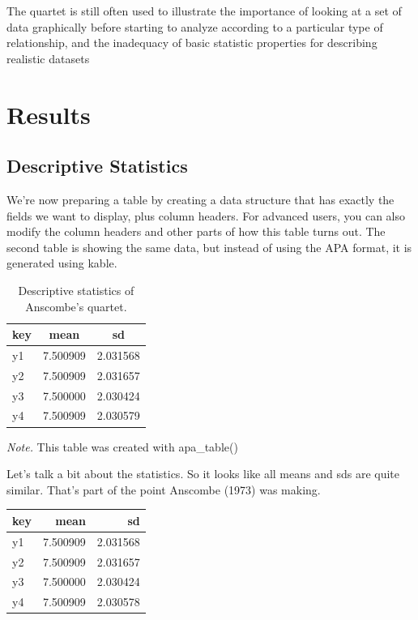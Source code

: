 \documentclass[english,floatsintext,man]{apa6}
\begin{document}
The quartet is still often used to illustrate the importance of looking
at a set of data graphically before starting to analyze according to a
particular type of relationship, and the inadequacy of basic statistic
properties for describing realistic datasets

\section{Results}\label{results}

\subsection{Descriptive Statistics}\label{descriptive-statistics}

We're now preparing a table by creating a data structure that has
exactly the fields we want to display, plus column headers. For advanced
users, you can also modify the column headers and other parts of how
this table turns out. The second table is showing the same data, but
instead of using the APA format, it is generated using kable.

\begin{table}[tbp]
\begin{center}
\begin{threeparttable}
\caption{Descriptive statistics of Anscombe's quartet.}
\begin{tabular}{lll}
\toprule
key & \multicolumn{1}{c}{mean} & \multicolumn{1}{c}{sd}\\
\midrule
y1 & 7.500909 & 2.031568\\
y2 & 7.500909 & 2.031657\\
y3 & 7.500000 & 2.030424\\
y4 & 7.500909 & 2.030579\\
\bottomrule
\end{tabular}
\begin{tablenotes}[para]
\textit{Note.} This table was created with apa\_table()
\end{tablenotes}
\end{threeparttable}
\end{center}
\end{table}

Let's talk a bit about the statistics. So it looks like all means and
sds are quite similar. That's part of the point Anscombe (1973) was
making.

\begin{tabular}{l|r|r}
\hline
key & mean & sd\\
\hline
y1 & 7.500909 & 2.031568\\
\hline
y2 & 7.500909 & 2.031657\\
\hline
y3 & 7.500000 & 2.030424\\
\hline
y4 & 7.500909 & 2.030578\\
\hline
\end{tabular}
\end{document}
